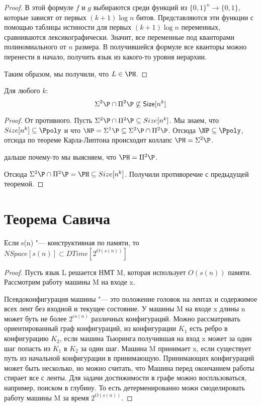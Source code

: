 \begin{proof}
	В этой формуле $f$ и $g$ выбираются среди функций из $\{0, 1\}^n \to \{0, 1\}$, которые
	зависят от первых $(k + 1)\log n$ битов.
	Представляются эти  функции с помощью таблицы истиности для первых $(k + 1)\log n$ переменных,
	сравниваются лексикографически.
	Значит, все переменные под кванторами полиномиального от $n$ размера.
	В получившейся формуле все кванторы можно перенести в начало, получить
	язык из какого-то уровня иерархии.

	Таким образом, мы получили, что $L \in \PH$.
\end{proof}

\begin{conseq}
	Для любого $k$:
	\[ \Sigma^2 \P \cap \Pi^2 \P \not\subseteq \mathsf{Size}[n^k] \]
\end{conseq}
\begin{proof}
	От противного.
	Пусть $\Sigma^2 \P \cap \Pi^2 \P \subseteq Size[n^k]$.
	Мы знаем, что $Size[n^k] \subseteq \Ppoly$ и
	что $\NP = \Sigma^1 \P \subseteq \Sigma^2 \P \cap \Pi^2 \P$.
	Отсюда $\NP \subseteq \Ppoly$, отсюда по теореме Карла-Липтона происходит
	коллапс $\PH = \Sigma^2 \P$.

	\TODO дальше почему-то мы выясняем, что $\PH = \Pi^2 \P$.

	Отсюда $\Sigma^2 \P \cap \Pi^2 \P = \PH \subseteq Size[n^k]$.
	Получили противоречие с предыдущей теоремой.
\end{proof}

\section{Теорема Савича}
\begin{theorem}
	Если s(n) "--- конструктивная по памяти, то 
	$NSpace[s(n)] \subset DTime[2^{O(s(n))}]$
\end{theorem}
\begin{proof}
	Пусть язык L решается НМТ M, которая использует $O(s(n))$ памяти. 
	Рассмотрим работу машины M на входе x. 

	Псевдоконфигурация машины "--- это положение головок на лентах 
	и содержимое всех лент без входной и текущее состояние. У машины 
	M на входе x длины n может буть не более $2^{cs(n)}$ различных
	конфигураций.  Можно рассматривать ориентированный граф конфигураций, 
	из конфигурации $K_1$ есть ребро в конфигурацию $K_2$, если машина 
	Тьюринга получившая на вход x может за один шаг попасть из $K_1$ в 
	$K_2$ за один шаг. Машина M принимает x, если существует путь из
	начальной конфигурации в принимающую. Принимающих конфигураций
	может быть несколько, но можно считать, что Машина перед окончанием работы
	стирает все с ленты. Для задачи достижимости в графе можно воспльзоваться,
	например, поиском в глубину. То есть детерменированно
	можн смоделировать работу машины M за время $2^{O(s(n))}$.
\end{proof}

